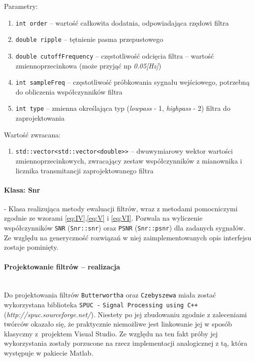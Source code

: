 \documentclass[a4paper, 11pt]{article}
\begin{document}
Parametry:
\begin{enumerate}
\item \verb|int order|  -- wartość całkowita dodatnia, odpowiadająca rzędowi filtra
\item \verb|double ripple|  -- tętnienie pasma przepustowego 
\item \verb|double cutoffFrequency|  -- częstotliwość odcięcia filtra  -- wartość zmiennoprzecinkowa (może przyjąć np \textit{0.05[Hz]})
\item \verb|int sampleFreq|  -- częstotliwość próbkowania sygnału wejściowego, potrzebną do obliczenia współczynników filtra
\item \verb|int type|  -- zmienna określająca typ (\textit{lowpass} - 1, \textit{highpass} - 2) filtra do zaprojektowania
\end{enumerate}
Wartość zwracana:
\begin{enumerate}
\item \verb|std::vector<std::vector<double>>|  -- dwuwymiarowy wektor wartości zmiennoprzecinkowych, zwracający zestaw współczynników z mianownika i licznika transmitancji zaprojektowanego filtra
\end{enumerate}

\paragraph{Klasa: Snr}
- Klasa realizująca metody ewaluacji filtrów, wraz z metodami pomocniczymi zgodnie ze wzorami \eqref{eq:IV},\eqref{eq:V} i \eqref{eq:VI}. Pozwala na wyliczenie współczynników \verb|SNR| (\verb|Snr::snr|) oraz \verb|PSNR| (\verb|Snr::psnr|) dla zadanych sygnałów. Ze względu na generyczność rozwiązań w niej zaimplementowanych opis interfejsu zostaje pominięty.

\paragraph{Projektowanie filtrów  -- realizacja}\mbox{} \\
Do projektowania filtrów \verb|Butterwortha| oraz \verb|Czebyszewa| miała zostać wykorzystana biblioteka \verb|SPUC -| \verb|Signal Processing using C++| (\textit{http://spuc.sourceforge.net/}). Niestety po jej zbudowaniu zgodnie z zaleceniami twórców okazało się, że praktycznie niemożliwe jest linkowanie jej w sposób klasyczny z~projektem Visual Studio. Ze względu na ten fakt próby jej wykorzystania zostały porzucone na rzecz implementacji analogicznej z tą, która występuje w pakiecie Matlab.
\end{document}
